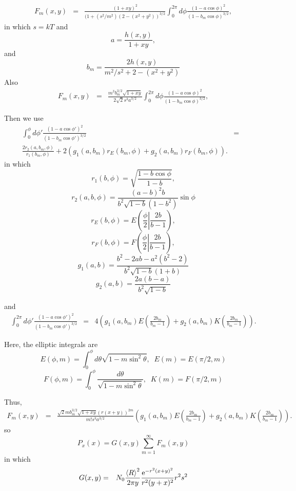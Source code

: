 \documentclass[11pt]{article}
\newcommand{\e}{{\rm e}}
\begin{document}
{{{{\begin{eqnarray} F_{m}(x,y)&=&\frac{(1+xy)^{2}}{(1+(s^{2}/m^{2})(2-(x^{2}+y^{2}))^{3/2}}\int_{0}^{2\pi}d\phi\frac{\left(1-a\cos\phi \right)^{2}}{(1-b_m\cos\phi)^{3/2}},
\end{eqnarray}
in which $s=kT$ and 
$$a=\frac{h(x,y)}{1+xy},$$
and
$$b_m=\frac{2h(x,y)}{m^{2}/s^{2}+2-(x^{2}+y^{2})}$$
Also
\begin{eqnarray} F_{m}(x,y)&=&\frac{m^{3}b_{m}^{3/2}\sqrt{1+xy}}{2\sqrt{2}s^{3}a^{3/2}}\int_{0}^{2\pi}d\phi\frac{\left(1-a\cos\phi \right)^{2}}{(1-b_m\cos\phi)^{3/2}},
\end{eqnarray}


Then we use
\begin{eqnarray}
\int_{0}^{\phi}d\phi'\frac{\left(1-a\cos\phi' \right)^{2}}{(1-b_m\cos\phi')^{3/2}}&=&\\
\frac{2r_{2}(a,b_m,\phi)}{r_{1}(b_m,\phi)}+2(g_{1}(a,b_m)r_{E}(b_m,\phi)+g_{2}(a,b_m)r_{F}(b_m,\phi)).
\end{eqnarray}
in which
$$r_{1}(b,\phi)=\sqrt{\frac{1-b\cos\phi}{1-b}},$$
$$r_{2}(a,b,\phi)=\frac{(a-b)^{2}b}{b^{2}\sqrt{1-b}(1-b^{2})}\sin\phi$$
$$r_{E}(b,\phi)=E\left(\frac{\phi}{2}\left|\frac{2b}{b-1}\right.\right),$$
$$r_{F}(b,\phi)=F\left(\frac{\phi}{2}\left|\frac{2b}{b-1}\right.\right),$$
$$g_{1}(a,b)=\frac{b^{2}-2ab-a^{2}(b^{2}-2)}{b^{2}\sqrt{1-b}(1+b)}$$
$$g_{2}(a,b)=\frac{2a(b-a)}{b^{2}\sqrt{1-b}}$$

and
\begin{eqnarray}
\int_{0}^{2\pi}d\phi'\frac{\left(1-a\cos\phi' \right)^{2}}{(1-b_m\cos\phi')^{3/2}}&=&
4\left(g_{1}(a,b_m)E\left(\frac{2b_m}{b_m-1}\right)+g_{2}(a,b_m)K\left(\frac{2b_m}{b_m-1}\right)\right).
\end{eqnarray}

Here, the elliptic integrals are
$$E(\phi,m)=\int_{0}^{\phi}d\theta\sqrt{1-m\sin^{2}\theta},\;\;E(m)=E(\pi/2,m)$$
$$F(\phi,m)=\int_{0}^{\phi}\frac{d\theta}{\sqrt{1-m\sin^{2}\theta}},\;\;K(m)=F(\pi/2,m)$$

Thus, 
\begin{eqnarray} F_{m}(x,y)&=&\frac{\sqrt{2}mb_{m}^{3/2}\sqrt{1+xy}(r(x+y))^{2m}}{m!s^{3}a^{3/2}}\left(g_{1}(a,b_m)E\left(\frac{2b_m}{b_m-1}\right)+g_{2}(a,b_m)K\left(\frac{2b_m}{b_m-1}\right)\right).
\end{eqnarray}
so
$$P_{x}(x)=G(x,y)\sum_{m=1}^{\infty}F_{m}(x,y)$$
in which
\begin{eqnarray}
G(x,y)&=&N_{0}\frac{\left<R\right>^{2}}{2\pi y}\frac{\e^{-r^{2}(x+y)^{2}}}{r^{2}(y+x)^{2}}
r^{2}s^{2}
\end{eqnarray}


}}}}
\end{document}
